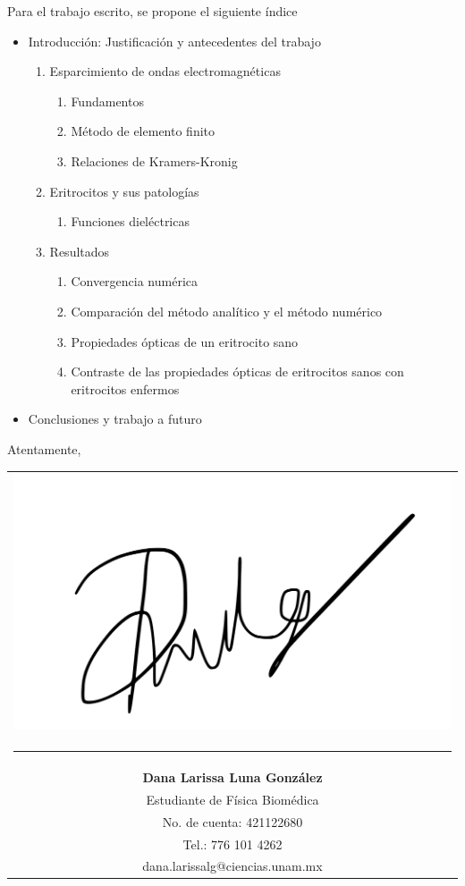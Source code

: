 \documentclass[11pt,letterpaper]{article}
\begin{document}
	Para el trabajo escrito, se propone el siguiente índice
	\begin{itemize}
		\setlength\itemsep{0.05em}
		\item  Introducción: Justificación y antecedentes del trabajo
		\begin{enumerate}
			\item Esparcimiento de ondas electromagnéticas
			\begin{enumerate}[label=1.\arabic*]
				\item Fundamentos
				\item Método de elemento finito
				\item Relaciones de Kramers-Kronig
			\end{enumerate}
			\item Eritrocitos y sus patologías
			\begin{enumerate} [label=2.\arabic*]
				\item Funciones dieléctricas
			\end{enumerate}
			\item Resultados
			\begin{enumerate} [label=3.\arabic*]
				\item Convergencia numérica
				\item Comparación del método analítico y el método numérico
				\item Propiedades ópticas de un eritrocito sano
				\item  Contraste de las propiedades ópticas de eritrocitos sanos con eritrocitos enfermos
			\end{enumerate}
		\end{enumerate}	
		\item Conclusiones y trabajo a futuro	
	\end{itemize}
	Atentamente,
	
	\vspace{1cm}
	{\hspace{0.7cm}\begin{tabular}{c}
		\includegraphics[height=2.cm]{firma}\\[-0.8cm] %
		\rule{5.5cm}{0.4pt} \\[0.2cm]
		\textbf{Dana Larissa Luna González} \\
		Estudiante de Física Biomédica \\
		No. de cuenta: 421122680 \\
		Tel.: 776 101 4262 \\
		dana.larissalg@ciencias.unam.mx \\
	\end{tabular}}
\end{document}

